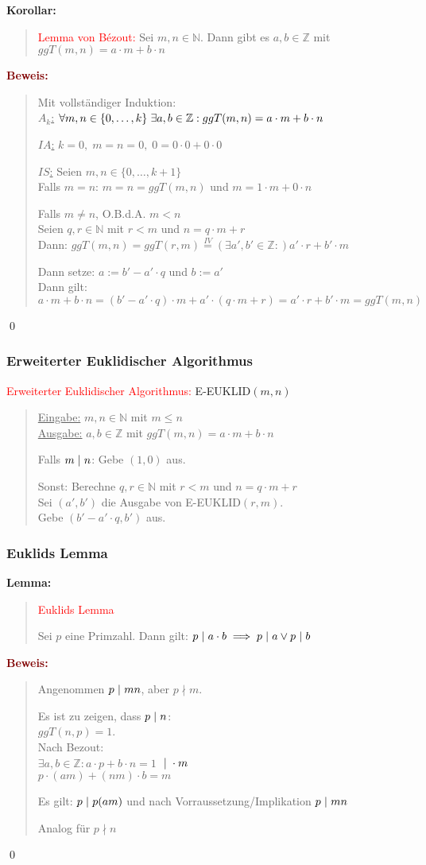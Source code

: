 \documentclass{article}
\newcommand{\smsp}{\phantom{\hspace{3px}}}
\newcommand{\red}[1]{\textcolor{red}{#1}}
\newcommand{\dgr}[1]{\textcolor{dgr}{#1}}
\newcommand{\maroon}[1]{\textcolor{maroon}{#1}}
\newcommand{\lem}[1]{\dgr{\textbf{Lemma: }}\begin{quote}#1\end{quote}}
\newcommand{\co}[1]{\dgr{\textbf{Korollar: }}\begin{quote}#1\end{quote}}
\newcommand{\pr}[1]{\maroon{\textbf{Beweis: }}\begin{quote}#1\end{quote}\qed}
\newcommand{\N}{\mathbb{N}}
\newcommand{\Z}{\mathbb{Z}}
\renewcommand{\st}{\smsp | \smsp}
\begin{document}
\co{
    \red{Lemma von Bézout:} Sei $m,n \in \N$. Dann gibt es $a, b \in \Z$ mit $ggT(m,n) = a \cdot m + b \cdot n$
}

\pr{
    Mit vollständiger Induktion:\\
    \underline{$A_k$:} $\forall m,n \in \{0, \dots, k\} \smsp \exists a,b \in \Z: ggT(m,n) = a \cdot m + b \cdot n$

    \underline{$IA$:} $k = 0, \; m = n = 0, \; 0 = 0 \cdot 0 + 0 \cdot 0$

    \underline{$IS$:} Seien $m,n \in \{0, \dots, k+1\}$\\
    Falls $m = n$: $m = n = ggT(m,n)$ und $m = 1 \cdot m + 0 \cdot n$

    Falls $m \neq n$, O.B.d.A. $m < n$\\
    Seien $q,r \in \N$ mit $r < m$ und $n = q \cdot m + r$\\
    Dann: $ggT(m,n) = ggT(r, m) \overset{IV}{=} (\exists a',b' \in \Z:) a' \cdot r + b' \cdot m$

    Dann setze: $a := b' - a' \cdot q$ und $b := a'$\\
    Dann gilt: $a \cdot m + b \cdot n = (b' - a' \cdot q) \cdot m + a' \cdot (q \cdot m + r) = a' \cdot r + b' \cdot m = ggT(m,n)$
}

\subsubsection{Erweiterter Euklidischer Algorithmus}

\red{Erweiterter Euklidischer Algorithmus:} E-EUKLID$(m,n)$
\begin{quote}
    \underline{Eingabe:} $m,n \in \N$ mit $m \leq n$\\
    \underline{Ausgabe:} $a, b \in \Z$ mit $ggT(m,n) = a \cdot m + b \cdot n$

    Falls $m \st n$: Gebe $(1,0)$ aus.

    Sonst: Berechne $q, r \in \N$ mit $r < m$ und $n = q \cdot m + r$\\
    Sei $(a',b')$ die Ausgabe von E-EUKLID$(r,m)$.\\
    Gebe $(b' - a' \cdot q, b')$ aus.
\end{quote}

\subsubsection{Euklids Lemma}

\lem{
    \red{Euklids Lemma}

    Sei $p$ eine Primzahl. Dann gilt: $p \st a \cdot b \implies p \st a \lor p \st b$
}
\pr{
    Angenommen $p \st mn$, aber $p \nmid m$.

    Es ist zu zeigen, dass $p \st n$:\\
    $ggT(n,p) = 1$.\\
    Nach Bezout:\\
    $\exists a,b \in \Z: a \cdot p + b \cdot n = 1$ $\st \cdot m$\\
    $p \cdot (am) + (nm) \cdot b = m$

    Es gilt: $p \st p(am)$ und nach Vorraussetzung/Implikation $p \st mn$

    Analog für $p \nmid n$
}
\end{document}
